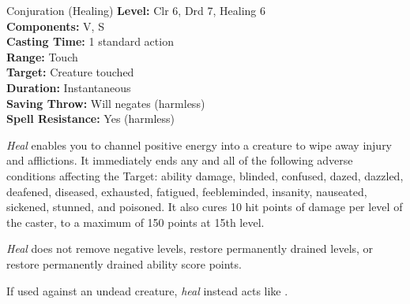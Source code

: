 {Conjuration (Healing)}
{
	\textbf{Level:}
	Clr 6, Drd 7, Healing 6\\
	\textbf{Components:}
	V, S\\
	\textbf{Casting Time:}
	1 standard action\\
	\textbf{Range:}
	Touch\\
	\textbf{Target:}
	Creature touched\\
	\textbf{Duration:}
	Instantaneous\\
	\textbf{Saving Throw:}
	Will negates (harmless)\\
	\textbf{Spell Resistance:}
	Yes (harmless)\\
}
{
	\emph{Heal} enables you to channel positive energy into a creature to wipe away injury and afflictions. It immediately ends any and all of the following adverse conditions affecting the Target: ability damage, blinded, confused, dazed, dazzled, deafened, diseased, exhausted, fatigued, feebleminded, insanity, nauseated, sickened, stunned, and poisoned. It also cures 10 hit points of damage per level of the caster, to a maximum of 150 points at 15th level.

	\emph{Heal} does not remove negative levels, restore permanently drained levels, or restore permanently drained ability score points.

	If used against an undead creature, \emph{heal} instead acts like .

}
